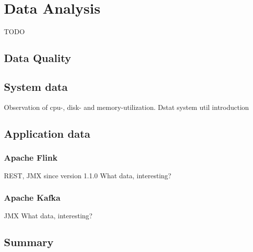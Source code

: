 \chapter{Data Analysis}

TODO


\section{Data Quality}

\section{System data}

Observation of cpu-, disk- and memory-utilization.
Dstat system util introduction

\section{Application data}

\subsection{Apache Flink}

REST, JMX since version 1.1.0
What data, interesting?

\subsection{Apache Kafka}

JMX
What data, interesting?

%
%
%

\section{Summary}
